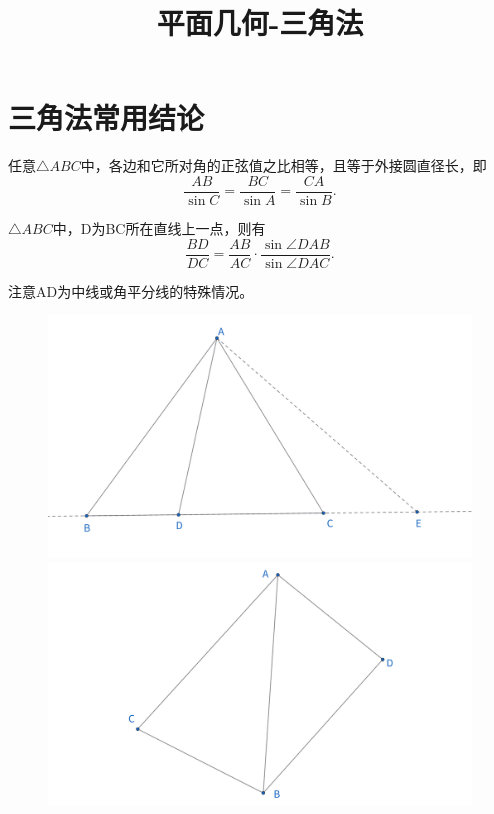 \documentclass{article}
\title{平面几何-三角法}
\author{}
\date{}
\begin{document}
\maketitle

\section{三角法常用结论}
\begin{theorem}[正弦定理]
    任意$\triangle ABC$中，各边和它所对角的正弦值之比相等，且等于外接圆直径长，即
    $$
\frac{AB}{\sin C}=\frac{BC}{\sin A}=\frac{CA}{\sin B}.
    $$
\end{theorem}

\begin{theorem}[分角线定理]
    $\triangle ABC$中，D为BC所在直线上一点，则有
    $$
    \frac{BD}{DC}  = \frac{AB}{AC}\cdot \frac{\sin\angle DAB}{\sin\angle DAC}.
    $$
    
    注意AD为中线或角平分线的特殊情况。
\end{theorem}

\begin{figure}[htbp]
    \centering
    \begin{minipage}[t]{0.45\textwidth}
    \centering
    \includegraphics[width=0.8\linewidth]{figures/分角线定理.png}
    \end{minipage}
    \begin{minipage}[t]{0.45\textwidth}
    \centering
    \includegraphics[width=0.8\linewidth]{figures/共边三角形.png}
    \end{minipage}
\end{figure}
\end{document}
